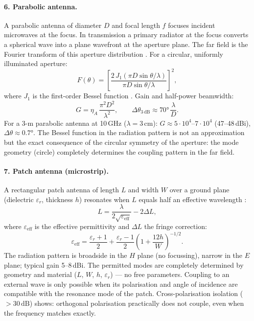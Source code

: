 \paragraph{6. Parabolic antenna.}

A parabolic antenna of diameter $D$ and focal length $f$ focuses incident
microwaves at the focus. In transmission a primary radiator at the focus
converts a spherical wave into a plane wavefront at the aperture plane.
The far field is the Fourier transform of this aperture distribution \EM.
For a circular, uniformly illuminated aperture:
\[
  F(\theta) = \left[\frac{2\,J_1(\pi D\sin\theta/\lambda)}
                        {\pi D\sin\theta/\lambda}\right]^2,
\]
where $J_1$ is the first-order Bessel function \cite{Balanis2016}. Gain
and half-power beamwidth:
\[
  G = \eta_A\,\frac{\pi^2 D^2}{\lambda^2}, \qquad
  \Delta\theta_{3\,\mathrm{dB}} \approx 70°\,\frac{\lambda}{D}.
\]
For a 3-m parabolic antenna at 10\,GHz ($\lambda = 3\,\mathrm{cm}$):
$G \approx 5\cdot10^4$--$7\cdot10^4$ (47--48\,dBi), $\Delta\theta \approx 0.7°$. The Bessel
function in the radiation pattern is not an approximation but the exact
consequence of the circular symmetry of the aperture: the mode geometry
(circle) completely determines the coupling pattern in the far field.

\paragraph{7. Patch antenna (microstrip).}

A rectangular patch antenna of length $L$ and width $W$ over a ground
plane (dielectric $\varepsilon_r$, thickness $h$) resonates when $L$
equals half an effective wavelength \cite{Pozar2012,Balanis2016}:
\[
  L = \frac{\lambda}{2\sqrt{\varepsilon_\mathrm{eff}}} - 2\Delta L,
\]
where $\varepsilon_\mathrm{eff}$ is the effective permittivity and
$\Delta L$ the fringe correction:
\[
  \varepsilon_\mathrm{eff} = \frac{\varepsilon_r+1}{2}
    + \frac{\varepsilon_r-1}{2}\left(1 + \frac{12h}{W}\right)^{-1/2}.
\]
The radiation pattern is broadside in the $H$ plane (no focussing), narrow
in the $E$ plane; typical gain 5--8\,dBi. The permitted modes are
completely determined by geometry and material ($L$, $W$, $h$,
$\varepsilon_r$) --- no free parameters. Coupling to an external wave is
only possible when its polarisation and angle of incidence are compatible
with the resonance mode of the patch. Cross-polarisation isolation
($> 30\,\mathrm{dB}$) shows: orthogonal polarisation practically does
not couple, even when the frequency matches exactly.

